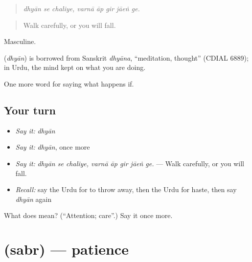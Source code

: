 \begin{quote}
       
\end{quote}

\begin{quote}
\emph{dhyān se chaliye, varnā āp gir jāeṅ ge.}
\end{quote}

\begin{quote}
Walk carefully, or you will fall.
\end{quote}

Masculine.

\begin{cousinweb}
\textbf{} (\emph{dhyān}) is borrowed from Sanskrit \emph{dhyāna}, \textquotedblleft{}meditation, thought\textquotedblright{} (CDIAL 6889); in Urdu, the mind kept on what you are doing.
\end{cousinweb}

\begin{grammarlens}[title={What you've built}]
One more word for saying what happens if.
\end{grammarlens}

\subsection*{Your turn}
\begin{itemize}
\raggedright
  \item \emph{Say it:} \emph{dhyān}
  \item \emph{Say it:} \emph{dhyān}, once more
  \item \emph{Say it:} \emph{dhyān se chaliye, varnā āp gir jāeṅ ge.} — Walk carefully, or you will fall.
  \item \emph{Recall:} say the Urdu for to throw away, then the Urdu for haste, then say \emph{dhyān} again
\end{itemize}

\begin{tcolorbox}[breakable,colback=teal!4,colframe=teal!35!black,title={Before you move on}]
What does  mean? (\textquotedblleft{}Attention; care\textquotedblright{}.) Say it once more.
\end{tcolorbox}
\section[\texorpdfstring{\ur{صبر} (sabr)}{صبر (sabr)}]{ (sabr) — patience}

